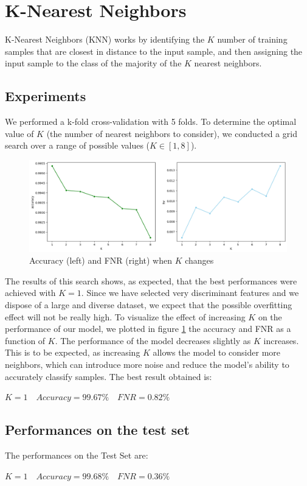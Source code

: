 \documentclass[twocolumn, switch]{article} %
\newcommand\x{0.7}
\begin{document}
\section{K-Nearest Neighbors}
\label{sec:knn}
K-Nearest Neighbors (KNN) works by identifying the $K$ number of training samples that are closest in distance to the input sample, and then assigning the input sample to the class of the majority of the $K$ nearest neighbors.
\subsection{Experiments}
We performed a k-fold cross-validation with 5 folds.
To determine the optimal value of $K$ (the number of nearest neighbors to consider), we conducted a grid search over a range of possible values ($K \in [1, 8]$).
\begin{figure}[ht!]
	\centering
	\includegraphics[width=\x\linewidth]{knn_accuracy_fnr.png}
	\caption{Accuracy (left) and FNR (right) when $K$ changes}
	\label{fig:knntrain}
\end{figure}
The results of this search shows, as expected, that the best performances were achieved with $K=1$. Since we have selected very discriminant features and we dispose of a large and diverse dataset, we expect that the possible overfitting effect will not be really high.
To visualize the effect of increasing $K$ on the performance of our model, we plotted in figure \ref{fig:knntrain} the accuracy and FNR as a function of $K$. The performance of the model decreases slightly as $K$ increases. This is to be expected, as increasing $K$ allows the model to consider more neighbors, which can introduce more noise and reduce the model's ability to accurately classify samples. The best result obtained is:
\begin{center}
	$K=1 \quad Accuracy=99.67\% \quad FNR=0.82\%$
\end{center}

\subsection{Performances on the test set}
The performances on the Test Set are:
\begin{center}
	$K=1 \quad Accuracy=99.68\% \quad FNR=0.36\%$
\end{center}
\end{document}
